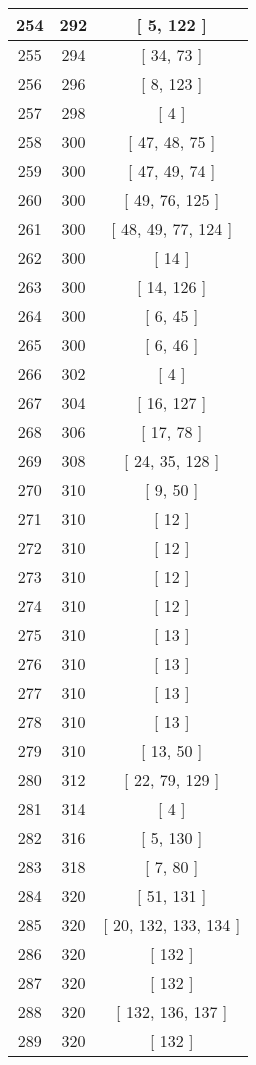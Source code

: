 \begin{center}
\begin{longtable}[H]{|| c c c ||}
\hline
254 & 292 & [ 5, 122 ] \\ 
\hline
255 & 294 & [ 34, 73 ] \\ 
\hline
256 & 296 & [ 8, 123 ] \\ 
\hline
257 & 298 & [ 4 ] \\ 
\hline
258 & 300 & [ 47, 48, 75 ] \\ 
\hline
259 & 300 & [ 47, 49, 74 ] \\ 
\hline
260 & 300 & [ 49, 76, 125 ] \\ 
\hline
261 & 300 & [ 48, 49, 77, 124 ] \\ 
\hline
262 & 300 & [ 14 ] \\ 
\hline
263 & 300 & [ 14, 126 ] \\ 
\hline
264 & 300 & [ 6, 45 ] \\ 
\hline
265 & 300 & [ 6, 46 ] \\ 
\hline
266 & 302 & [ 4 ] \\ 
\hline
267 & 304 & [ 16, 127 ] \\ 
\hline
268 & 306 & [ 17, 78 ] \\ 
\hline
269 & 308 & [ 24, 35, 128 ] \\ 
\hline
270 & 310 & [ 9, 50 ] \\ 
\hline
271 & 310 & [ 12 ] \\ 
\hline
272 & 310 & [ 12 ] \\ 
\hline
273 & 310 & [ 12 ] \\ 
\hline
274 & 310 & [ 12 ] \\ 
\hline
275 & 310 & [ 13 ] \\ 
\hline
276 & 310 & [ 13 ] \\ 
\hline
277 & 310 & [ 13 ] \\ 
\hline
278 & 310 & [ 13 ] \\ 
\hline
279 & 310 & [ 13, 50 ] \\ 
\hline
280 & 312 & [ 22, 79, 129 ] \\ 
\hline
281 & 314 & [ 4 ] \\ 
\hline
282 & 316 & [ 5, 130 ] \\ 
\hline
283 & 318 & [ 7, 80 ] \\ 
\hline
284 & 320 & [ 51, 131 ] \\ 
\hline
285 & 320 & [ 20, 132, 133, 134 ] \\ 
\hline
286 & 320 & [ 132 ] \\ 
\hline
287 & 320 & [ 132 ] \\ 
\hline
288 & 320 & [ 132, 136, 137 ] \\ 
\hline
289 & 320 & [ 132 ] \\ 

\end{longtable}
\end{center}
